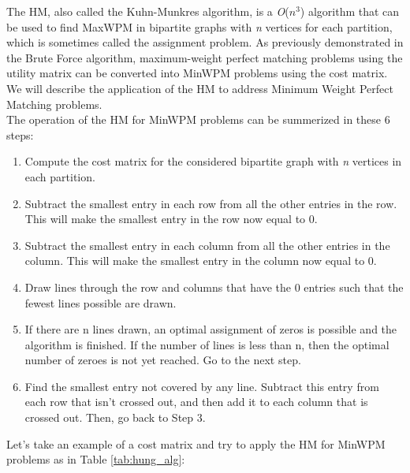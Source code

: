 The HM, also called the Kuhn-Munkres algorithm, is a \textit{O}($\textit{n}^3$) algorithm that can be used to find MaxWPM in bipartite graphs with \textit{n} vertices for each partition, which is sometimes called the assignment problem.
As previously demonstrated in the Brute Force algorithm, maximum-weight perfect matching problems using the utility matrix can be converted into MinWPM problems using the cost matrix. 
We will describe the application of the HM to address Minimum Weight Perfect Matching problems.\\
The operation of the HM for MinWPM problems can be summerized in these 6 steps:
\begin{enumerate}
    \item {Compute the cost matrix for the considered bipartite graph with \textit{n} vertices in each partition.}
    \item {Subtract the smallest entry in each row from all the other entries in the row. This will make the smallest entry in the row now equal to 0.}
    \item {Subtract the smallest entry in each column from all the other entries in the column. This will make the smallest entry in the column now equal to 0.}
    \item {Draw lines through the row and columns that have the 0 entries such that the fewest lines possible are drawn.}
    \item {If there are n lines drawn, an optimal assignment of zeros is possible and the algorithm is finished. If the number of lines is less than n, then the optimal number of zeroes is not yet reached. Go to the next step.}
    \item {Find the smallest entry not covered by any line. Subtract this entry from each row that isn’t crossed out, and then add it to each column that is crossed out. Then, go back to Step 3.}
\end{enumerate}
Let's take an example of a cost matrix and try to apply the HM for MinWPM problems as in Table \ref{tab:hung_alg}:

